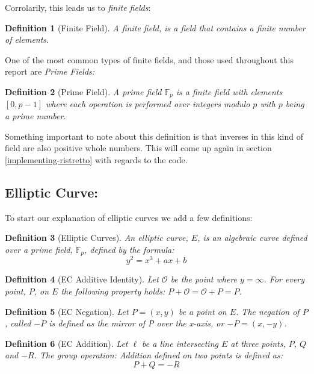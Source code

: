 \documentclass{article}
\newtheorem{definition}{Definition}[section]
\renewcommand{\O}{\mathcal{O}}
\newcommand{\F}{\mathbb{F}}
\begin{document}
Corrolarily, this leads us to \textit{finite fields}:

\begin{definition}[Finite Field]
	A finite field, is a field that contains a finite number of elements.
\end{definition}

One of the most common types of finite fields, and those used throughout this report are \textit{Prime Fields:} 

\begin{definition}[Prime Field]
	A prime field $\F_p$ is a finite field with elements $[0,p-1]$
	where each operation is performed over integers modulo $p$ with $p$ being a prime number.
\end{definition}

Something important to note about this definition is that inverses in
this kind of field are also positive whole numbers. This will come up
again in section \ref{implementing-ristretto} with regards to the code.

\subsection{Elliptic Curve:}\label{elliptic-curves}

To start our explanation of elliptic curves we add a few definitions:

\begin{definition}[Elliptic Curves]
	An elliptic curve, $E$, is an algebraic curve defined over a prime field, $\F_p$, defined by the formula:
	$$y^2 = x^3 + ax + b$$
\end{definition}

\begin{definition}[EC Additive Identity]
	Let $\O$ be the point where $y = \infty$. For every point, $P$,
	on $E$ the following property holds:
	$P + \O = \O + P = P$.
\end{definition}

\begin{definition}[EC Negation]
	Let $P = (x,y)$ be a point on $E$. The negation of $P$, called $-P$
	is defined as the mirror of P over the x-axis, or $-P = (x,-y)$.
\end{definition}

\begin{definition}[EC Addition]
	Let $\ell$ be a line intersecting $E$ at three points, $P$, $Q$ and
	$-R$. The group operation: Addition defined on two points is defined
	as:
	$$P + Q = {-R}$$
\end{definition}
\end{document}
